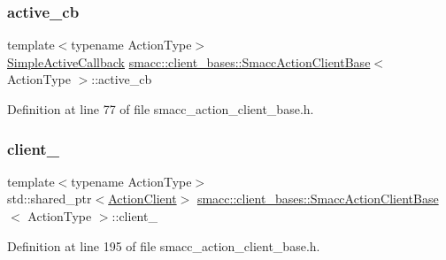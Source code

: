 \subsubsection{\texorpdfstring{active\+\_\+cb}{active\_cb}}
{\footnotesize\ttfamily template$<$typename Action\+Type$>$ \\
\hyperlink{classsmacc_1_1client__bases_1_1SmaccActionClientBase_acfd06f7c33418c03a340e74b00a4dddc}{Simple\+Active\+Callback} \hyperlink{classsmacc_1_1client__bases_1_1SmaccActionClientBase}{smacc\+::client\+\_\+bases\+::\+Smacc\+Action\+Client\+Base}$<$ Action\+Type $>$\+::active\+\_\+cb}



Definition at line 77 of file smacc\+\_\+action\+\_\+client\+\_\+base.\+h.

\mbox{\label{classsmacc_1_1client__bases_1_1SmaccActionClientBase_ac0c1dd56420ecb53cf0c90cd8bef1b4c}} 
\subsubsection{\texorpdfstring{client\+\_\+}{client\_}}
{\footnotesize\ttfamily template$<$typename Action\+Type$>$ \\
std\+::shared\+\_\+ptr$<$\hyperlink{classsmacc_1_1client__bases_1_1SmaccActionClientBase_ab4cb0717885b95d577f82f4133db7f5f}{Action\+Client}$>$ \hyperlink{classsmacc_1_1client__bases_1_1SmaccActionClientBase}{smacc\+::client\+\_\+bases\+::\+Smacc\+Action\+Client\+Base}$<$ Action\+Type $>$\+::client\+\_\+\hspace{0.3cm}{\ttfamily [protected]}}



Definition at line 195 of file smacc\+\_\+action\+\_\+client\+\_\+base.\+h.

\mbox{\label{classsmacc_1_1client__bases_1_1SmaccActionClientBase_a39fc5030e98f1e30e9919a9d9737b78a}} 
